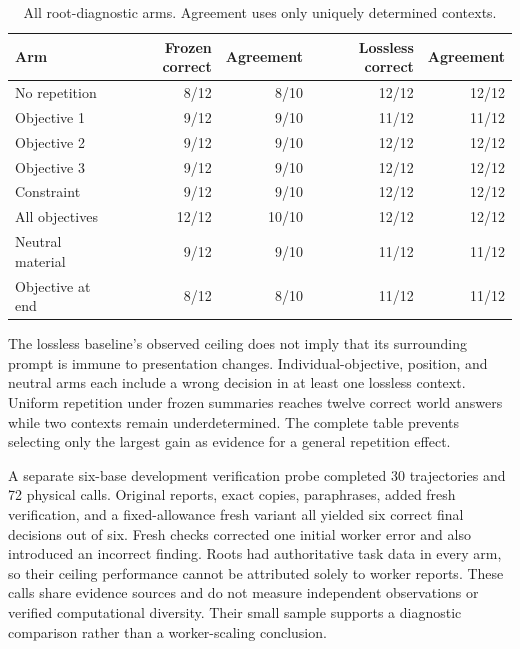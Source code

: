 \documentclass{svproc}
\begin{document}
\begin{table}[htbp]
\centering\small
\setlength{\tabcolsep}{4pt}
\caption{All root-diagnostic arms. Agreement uses only uniquely determined contexts.}\label{tab:root-all}
\begin{tabular}{lrrrr}\toprule
Arm & Frozen correct & Agreement & Lossless correct & Agreement\\\midrule
No repetition & 8/12 & 8/10 & 12/12 & 12/12\\
Objective 1 & 9/12 & 9/10 & 11/12 & 11/12\\
Objective 2 & 9/12 & 9/10 & 12/12 & 12/12\\
Objective 3 & 9/12 & 9/10 & 12/12 & 12/12\\
Constraint & 9/12 & 9/10 & 12/12 & 12/12\\
All objectives & 12/12 & 10/10 & 12/12 & 12/12\\
Neutral material & 9/12 & 9/10 & 11/12 & 11/12\\
Objective at end & 8/12 & 8/10 & 11/12 & 11/12\\
\bottomrule\end{tabular}
\end{table}

The lossless baseline's observed ceiling does not imply that its surrounding
prompt is immune to presentation changes. Individual-objective, position, and
neutral arms each include a wrong decision in at least one lossless context.
Uniform repetition under frozen summaries reaches twelve correct world answers
while two contexts remain underdetermined. The complete table prevents selecting
only the largest gain as evidence for a general repetition effect.

A separate six-base development verification probe completed 30 trajectories and
72 physical calls. Original reports, exact copies, paraphrases, added fresh
verification, and a fixed-allowance fresh variant all yielded six correct final
decisions out of six. Fresh checks corrected one initial worker error and also
introduced an incorrect finding. Roots had authoritative task data in every arm,
so their ceiling performance cannot be attributed solely to worker reports.
These calls share evidence sources and do not measure independent observations
or verified computational diversity. Their small sample supports a diagnostic
comparison rather than a worker-scaling conclusion.
\end{document}
